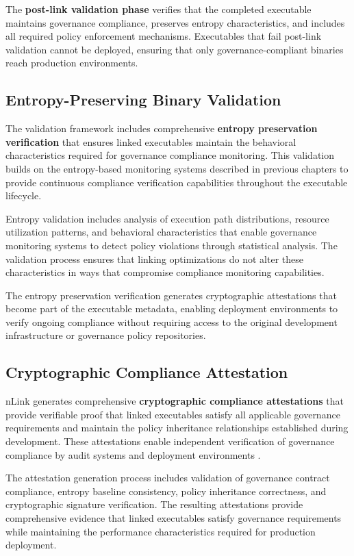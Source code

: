 The \textbf{post-link validation phase} verifies that the completed executable maintains governance compliance, preserves entropy characteristics, and includes all required policy enforcement mechanisms. Executables that fail post-link validation cannot be deployed, ensuring that only governance-compliant binaries reach production environments.

\subsection{Entropy-Preserving Binary Validation}

The validation framework includes comprehensive \textbf{entropy preservation verification} that ensures linked executables maintain the behavioral characteristics required for governance compliance monitoring. This validation builds on the entropy-based monitoring systems described in previous chapters to provide continuous compliance verification capabilities throughout the executable lifecycle.

Entropy validation includes analysis of execution path distributions, resource utilization patterns, and behavioral characteristics that enable governance monitoring systems to detect policy violations through statistical analysis. The validation process ensures that linking optimizations do not alter these characteristics in ways that compromise compliance monitoring capabilities.

The entropy preservation verification generates cryptographic attestations that become part of the executable metadata, enabling deployment environments to verify ongoing compliance without requiring access to the original development infrastructure or governance policy repositories.

\subsection{Cryptographic Compliance Attestation}

nLink generates comprehensive \textbf{cryptographic compliance attestations} that provide verifiable proof that linked executables satisfy all applicable governance requirements and maintain the policy inheritance relationships established during development. These attestations enable independent verification of governance compliance by audit systems and deployment environments \cite{TODO:compliance-attestation-spec}.

The attestation generation process includes validation of governance contract compliance, entropy baseline consistency, policy inheritance correctness, and cryptographic signature verification. The resulting attestations provide comprehensive evidence that linked executables satisfy governance requirements while maintaining the performance characteristics required for production deployment.

